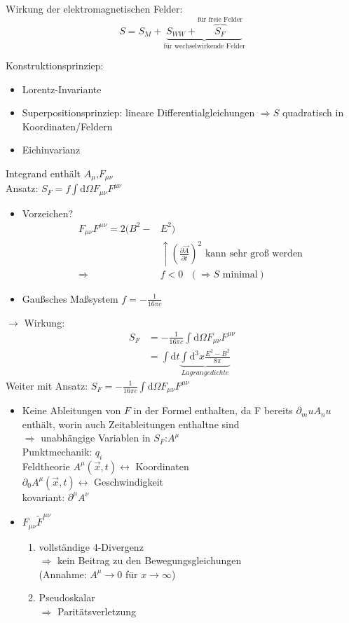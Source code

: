 \documentclass[a4paper]{article}
\begin{document}
Wirkung der elektromagnetischen Felder:
\begin{equation}
S=S_M+\underbrace{S_{WW}+\overbrace{S_F}^{\text{für freie Felder}}}_{\text{für
wechselwirkende Felder}}
\end{equation}

Konstruktionsprinziep:
\begin{itemize}
  \item Lorentz-Invariante
  \item Superpositionsprinziep: lineare Differentialgleichungen $\Rightarrow S$
  quadratisch in Koordinaten/Feldern
  \item Eichinvarianz
\end{itemize}
Integrand enthält $A_\mu$,$F_{\mu\nu}$\\
Ansatz: $S_F=f\int \mathrm{d}\Omega F_{\mu\nu}F^{\mu\nu}$\\
\begin{itemize}
  \item Vorzeichen?
	\begin{align}
	F_{\mu\nu}F^{\mu\nu}=2(B^2-&E^2)\\
	&\uparrow \left(\frac{\partial \vec{A}}{\partial t}\right)^2 \text{ kann sehr
	groß werden}\\
	\Rightarrow &f<0 \text{   } (\Rightarrow S \text{ minimal})
	\end{align}
   \item Gaußsches Maßsystem $f=-\frac{1}{16\pi c}$
\end{itemize}
$\rightarrow$ Wirkung:
\begin{align}
S_F&=-\frac{1}{16\pi c}\int \mathrm{d}\Omega F_{\mu\nu}F^{\mu\nu}\\
&=\int \mathrm{d}t\underbrace{\int \mathrm{d}^3x \frac{E^2-B^2}{8\pi}}_{Lagrangedichte}
\end{align}
Weiter mit Ansatz: $S_F=-\frac{1}{16\pi c}\int \mathrm{d}\Omega F_{\mu\nu}F^{\mu\nu}$
\begin{itemize}
  \item Keine Ableitungen von $F$ in der Formel enthalten, da F bereits
  $\partial_mu A_nu$ enthält, worin auch Zeitableitungen enthaltne sind
  \\$\Rightarrow$ unabhängige Variablen in $S_F$:$A^\mu$\\
  Punktmechanik: $q_i$\\ Feldtheorie $A^\mu(\vec{x},t) \leftrightarrow $
  Koordinaten \\ $\partial_0 A^\mu(\vec{x},t) \leftrightarrow $
  Geschwindigkeit \\ kovariant: $\partial^\mu A^\nu$
  \item $F_{\mu\nu}\tilde{F}^{\mu\nu}$ 
  	\begin{enumerate}
	  \item vollständige 4-Divergenz \\ $\Rightarrow$ kein Beitrag zu den
	  Bewegungsgleichungen\\ (Annahme: $A^\mu \rightarrow 0$ für
	  $x\rightarrow\infty$)
	  \item Pseudoskalar\\ $\Rightarrow$ Paritätsverletzung
	\end{enumerate}
\end{itemize}
\end{document}

